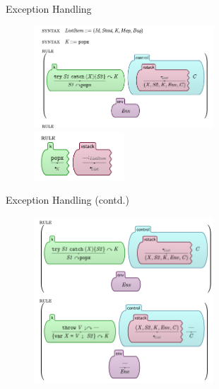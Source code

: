 \documentclass{beamer}
\begin{document}
\begin{frame}{Exception Handling}
    \begin{figure}[H]
        \centering
    \includegraphics[width=0.6\textwidth]{trycatch} \\
    \includegraphics[width=0.3\textwidth]{pop} \\
    \end{figure}
\end{frame}
\begin{frame}{Exception Handling (contd.)}
    \begin{figure}[H]
        \centering
    \includegraphics[width=0.6\textwidth]{throw} \\
    \end{figure}
\end{frame}
\end{document}
